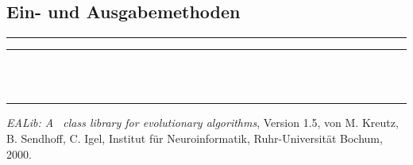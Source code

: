 \documentclass[12pt]{report}
\begin{document}
\vspace*{10pt}

\subsection{Ein- und Ausgabemethoden}

\vspace*{10pt}

\methodgrayfalse

\parindent0mm
\hrule
\vspace*{1pt}
\hrule
{}\\
\\\hrule



\begin{thebibliography}{55}
  
    {\em EALib: A \cpp\ class library for evolutionary
    algorithms}, Version 1.5, von M. Kreutz, B. Sendhoff, C. Igel,
    Institut f\"ur Neuroinformatik, Ruhr-Universit\"at Bochum, 
    2000.

\end{thebibliography}
\end{document}
